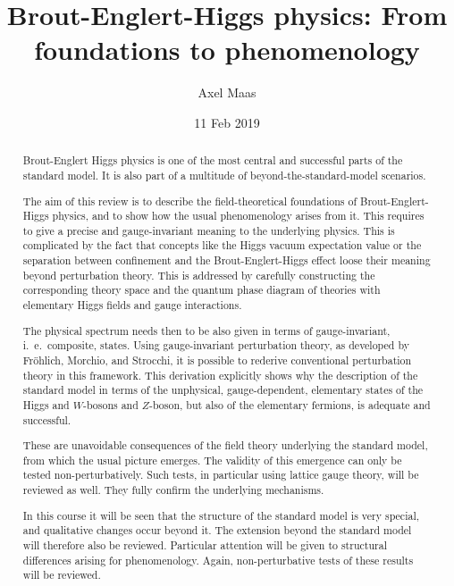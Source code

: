 \documentclass[final,12pt,3p,longtitle]{elsarticle}
\date{11 Feb 2019}
\newcommand*{\1}{1\!\!\!\bot}
\begin{document}
\begin{frontmatter}
 
\title{Brout-Englert-Higgs physics: From foundations to phenomenology}%

\author{Axel Maas}

\address{Institute of Physics, NAWI Graz, University of Graz, Universit\"atsplatz 5, A-8010 Graz, Austria}

\begin{abstract}

Brout-Englert Higgs physics is one of the most central and successful parts of the standard model. It is also part of a multitude of beyond-the-standard-model scenarios.

The aim of this review is to describe the field-theoretical foundations of Brout-Englert-Higgs physics, and to show how the usual phenomenology arises from it. This requires to give a precise and gauge-invariant meaning to the underlying physics. This is complicated by the fact that concepts like the Higgs vacuum expectation value or the separation between confinement and the Brout-Englert-Higgs effect loose their meaning beyond perturbation theory. This is addressed by carefully constructing the corresponding theory space and the quantum phase diagram of theories with elementary Higgs fields and gauge interactions.

The physical spectrum needs then to be also given in terms of gauge-invariant, i.\ e.\ composite, states. Using gauge-invariant perturbation theory, as developed by Fr\"ohlich, Morchio, and Strocchi, it is possible to rederive conventional perturbation theory in this framework. This derivation explicitly shows why the description of the standard model in terms of the unphysical, gauge-dependent, elementary states of the Higgs and $W$-bosons and $Z$-boson, but also of the elementary fermions, is adequate and successful.

These are unavoidable consequences of the field theory underlying the standard model, from which the usual picture emerges. The validity of this emergence can only be tested non-perturbatively. Such tests, in particular using lattice gauge theory, will be reviewed as well. They fully confirm the underlying mechanisms.

In this course it will be seen that the structure of the standard model is very special, and qualitative changes occur beyond it. The extension beyond the standard model will therefore also be reviewed. Particular attention will be given to structural differences arising for phenomenology. Again, non-perturbative tests of these results will be reviewed.


\end{abstract}
\end{frontmatter}
\end{document}

